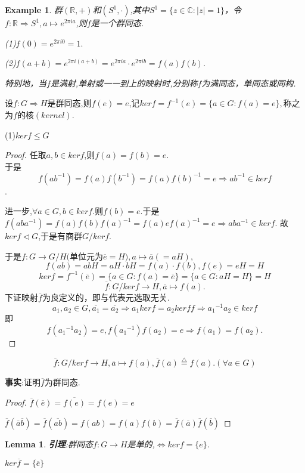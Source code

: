 \documentclass[UTF8]{article}
\newtheorem{exa}{Example}[section]
\newtheorem{lem}{Lemma}[section]
\begin{document}
\begin{exa}
	\quad 群$(\mathbb{R},+)$和$(S^1,\cdot)$,其中$S^1=\{z\in \mathbb{C}:|z|=1\}$，令$f:\mathbb{R}\Rightarrow S^1,a\mapsto e^{2\pi ia}$,则$f$是一个群同态.
	
	(1)$f(0)=e^{2\pi i0}=1.$
	
	(2)$f(a+b)=e^{2\pi i(a+b)}=e^{2\pi ia}\cdot e^{2\pi ib}=f(a)f(b)$.
	
	特别地，当$f$是满射,单射或一一到上的映射时,分别称$f$为满同态，单同态或同构.
\end{exa}

设$f:G\Rightarrow H$是群同态,则$f(e)=e$,记$ker f=f^{-1}(e)=\{a\in G:f(a)=e\},$称之为$f$的核$(kernel)$.

(1)$ker f\le G$
\begin{proof}
	任取$a,b\in ker f$,则$f(a)=f(b)=e.$\\于是$$f(ab^{-1})=f(a)f(b^{-1})=f(a){f(b)}^{-1}=e\Rightarrow ab^{-1}\in kerf$$.
	
	进一步,$\forall a\in G,b\in kerf.$则$f(b)=e.$于是$f(aba^{-1})=f(a)f(b){f(a)}^{-1}=f(a)e{f(a)}^{-1}=e\Rightarrow aba^{-1}\in kerf.$
	故$ker f\triangleleft G$,于是有商群$G/kerf.$
	
	于是$f:G\to G/H($单位元为$\overline e=H),a\mapsto \overline a(=aH),$
	$$f(ab)=abH=aH\cdot bH=f(a)\cdot f(b),f(e)=eH=H$$
	$$ker f=f^{-1}(\overline e)=\{a\in G:f(a)=\overline e\}=\{a\in G:aH=H\}=H$$
	$$\overline f:G/ker f\to H,\overline a\mapsto f(a).$$
	下证映射$\overline f$为良定义的，即与代表元选取无关.
	$$a_1,a_2\in G,\overline{a_1}=\overline{a_2}\Rightarrow a_1ker f=a_2ker f f\Rightarrow {a_1}^{-1}a_2\in ker f$$
	即$$f({a_1}^{-1}a_2)=e,f({a_1}^{-1})f(a_2)=e\Rightarrow f(a_1)=f(a_2).$$
\end{proof}
$$\overline{f}:G/ker f\to H,\overline{a}\mapsto f(a),\overline{f}(\overline{a})\stackrel{\bigtriangleup}{=}f(a).(\forall a\in G)$$

\textbf{事实}:证明$\overline{f}$为群同态.
\begin{proof}
	$\overline{f}(\overline{e})=\overline{f(e)}=f(e)=e$
	
	$\overline{f}(\overline{a}\overline{b})=\overline{f}(\overline{ab})=f(ab)=f(a)f(b)=\overline{f}(\overline{a})\overline{f}(\overline{b})$
\end{proof}


\begin{lem}
	\textbf{引理}:群同态$f:G\to H$是单的,$\Leftrightarrow ker f=\{e\}$.
\end{lem}

$ker \overline{f}=\{\overline{e}\}$
\end{document}
